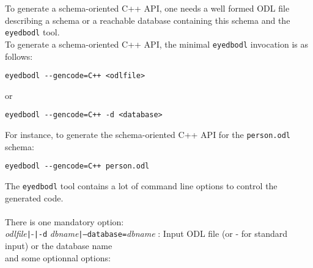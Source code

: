 To generate a schema-oriented C++ API, one needs a well formed ODL
file describing a schema or a reachable database containing this schema
and the \texttt{eyedbodl} tool.
\\
To generate a schema-oriented C++ API, the minimal \texttt{eyedbodl} invocation
is as follows:
\begin{verbatim}
eyedbodl --gencode=C++ <odlfile>
\end{verbatim}
or
\begin{verbatim}
eyedbodl --gencode=C++ -d <database>
\end{verbatim}
For instance, to generate the schema-oriented C++ API for the \texttt{person.odl}
schema:
\begin{verbatim}
eyedbodl --gencode=C++ person.odl
\end{verbatim}
The \texttt{eyedbodl} tool contains a lot of command line options to
control the generated code.
\\
\\
There is one mandatory option:\\
\emph{odlfile}\texttt{|}-\texttt{|}\texttt{-d} \emph{dbname}\texttt{|}\texttt{--database=}\emph{dbname} : Input ODL file (or - for standard input) or the database name\\
and some optionnal options:
